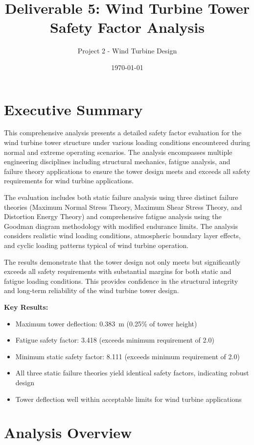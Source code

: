\documentclass[12pt]{article}
\title{Deliverable 5: Wind Turbine Tower Safety Factor Analysis}
\author{Project 2 - Wind Turbine Design}
\date{\today}
\begin{document}
\maketitle

\section{Executive Summary}

This comprehensive analysis presents a detailed safety factor evaluation for the wind turbine tower structure under various loading conditions encountered during normal and extreme operating scenarios. The analysis encompasses multiple engineering disciplines including structural mechanics, fatigue analysis, and failure theory applications to ensure the tower design meets and exceeds all safety requirements for wind turbine applications.

The evaluation includes both static failure analysis using three distinct failure theories (Maximum Normal Stress Theory, Maximum Shear Stress Theory, and Distortion Energy Theory) and comprehensive fatigue analysis using the Goodman diagram methodology with modified endurance limits. The analysis considers realistic wind loading conditions, atmospheric boundary layer effects, and cyclic loading patterns typical of wind turbine operation.

The results demonstrate that the tower design not only meets but significantly exceeds all safety requirements with substantial margins for both static and fatigue loading conditions. This provides confidence in the structural integrity and long-term reliability of the wind turbine tower design.

\textbf{Key Results:}
\begin{itemize}
    \item Maximum tower deflection: \SI{0.383}{\meter} (0.25\% of tower height)
    \item Fatigue safety factor: 3.418 (exceeds minimum requirement of 2.0)
    \item Minimum static safety factor: 8.111 (exceeds minimum requirement of 2.0)
    \item All three static failure theories yield identical safety factors, indicating robust design
    \item Tower deflection well within acceptable limits for wind turbine applications
\end{itemize}

\section{Analysis Overview}
\end{document}
